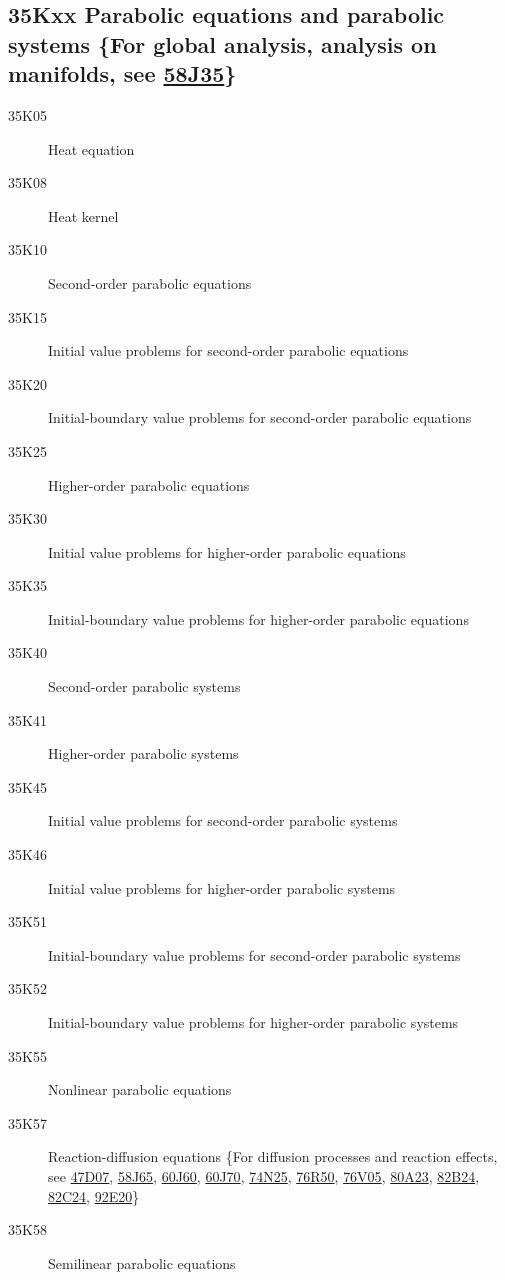 \documentclass[letterpaper]{article}
\begin{document}
\subsection*{35Kxx  Parabolic equations and parabolic  systems  \{For global analysis, analysis on manifolds, see \hyperref[58J35]{58J35}\} }\label{35Kxx}
\begin{description}
\item [35K05]\label{35K05} Heat equation
\item [35K08]\label{35K08} Heat kernel
\item [35K10]\label{35K10} Second-order parabolic  equations
\item [35K15]\label{35K15} Initial value problems for second-order parabolic equations
\item [35K20]\label{35K20} Initial-boundary value problems for second-order parabolic equations 
\item [35K25]\label{35K25} Higher-order parabolic  equations
\item [35K30]\label{35K30} Initial value problems for higher-order parabolic  equations
\item [35K35]\label{35K35} Initial-boundary value problems for higher-order parabolic  equations
\item [35K40]\label{35K40} Second-order parabolic systems  
\item [35K41]\label{35K41} Higher-order parabolic systems 
\item [35K45]\label{35K45} Initial value problems for second-order parabolic systems 
\item [35K46]\label{35K46} Initial value problems for higher-order parabolic systems 
\item [35K51]\label{35K51} Initial-boundary value problems for second-order parabolic systems 
\item [35K52]\label{35K52} Initial-boundary value problems for higher-order  parabolic systems 
\item [35K55]\label{35K55} Nonlinear parabolic equations
\item [35K57]\label{35K57} Reaction-diffusion equations \{For diffusion processes and reaction effects, see \hyperref[47D07]{47D07}, \hyperref[58J65]{58J65}, \hyperref[60J60]{60J60}, \hyperref[60J70]{60J70}, \hyperref[74N25]{74N25}, \hyperref[76R50]{76R50}, \hyperref[76V05]{76V05}, \hyperref[80A23]{80A23},  \hyperref[82B24]{82B24}, \hyperref[82C24]{82C24}, \hyperref[92E20]{92E20}\}
\item [35K58]\label{35K58} Semilinear parabolic equations

\end{description}
\end{document}
